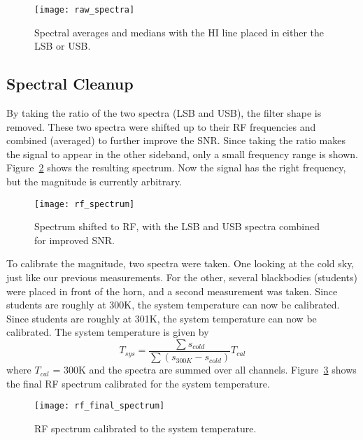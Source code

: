 \documentclass[12pt]{article}
\begin{document}
\begin{figure}
\centering
\texttt{[image: raw\_spectra]}
\caption{Spectral averages and medians with the HI line placed in either the LSB or USB.}
\label{fig:rawspectra}
\end{figure}


\subsection{Spectral Cleanup}
By taking the ratio of the two spectra (LSB and USB), the filter shape is removed.
These two spectra were shifted up to their RF frequencies and combined (averaged) to further improve the SNR.
Since taking the ratio makes the signal to appear in the other sideband, only a small frequency range is shown.
Figure~\ref{fig:rfspectrum} shows the resulting spectrum.
Now the signal has the right frequency, but the magnitude is currently arbitrary.


\begin{figure}
\centering
\texttt{[image: rf\_spectrum]}
\caption{Spectrum shifted to RF, with the LSB and USB spectra combined for improved SNR.}
\label{fig:rfspectrum}
\end{figure}

To calibrate the magnitude, two spectra were taken.
One looking at the cold sky, just like our previous measurements.
For the other, several blackbodies (students) were placed in front of the horn, and a second measurement was taken.
Since students are roughly at 300K, the system temperature can now be calibrated.
Since students are roughly at 301K, the system temperature can now be calibrated.
The system temperature is given by
\begin{equation}
T_{sys}=\frac{\sum{s_{cold}}}{\sum{\left(s_{300K}-s_{cold}\right)}}T_{cal}
\end{equation}
where $T_{cal}$ = 300K and the spectra are summed over all channels.
Figure~\ref{fig:rffin} shows the final RF spectrum calibrated for the system temperature.

\begin{figure}
\centering
\texttt{[image: rf\_final\_spectrum]}
\caption{RF spectrum calibrated to the system temperature.}
\label{fig:rffin}
\end{figure}
\end{document}
